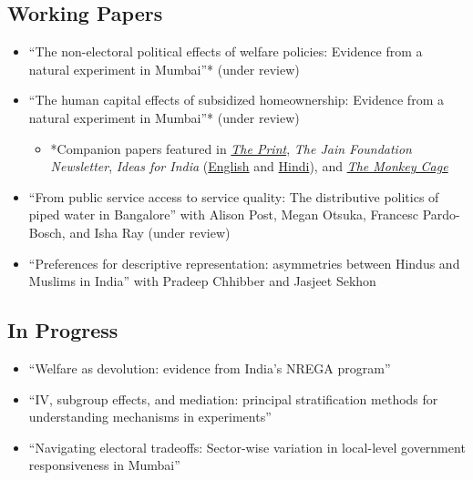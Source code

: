 \documentclass[11pt]{article}
\begin{document}
\subsection*{Working Papers}

\begin{itemize}
	\item[]``The non-electoral political effects of welfare policies: Evidence from a natural experiment in Mumbai''* (under review)
	\item[]``The human capital effects of subsidized homeownership: Evidence from a natural experiment in Mumbai''* (under review)
	\begin{itemize}
	\item[]*Companion papers featured in \href{https://theprint.in/opinion/mumbai-residents-win-govt-housing-lottery-and-spend-more-on-kids-education-jobs-study/290485/}{\textit{The Print}}, \textit{The Jain Foundation Newsletter}, \textit{Ideas for India} (\href{https://www.ideasforindia.in/topics/poverty-inequality/household-level-effects-of-affordable-housing-evidence-from-mumbai.html}{English} and \href{https://www.ideasforindia.in/topics/poverty-inequality/household-level-effects-of-affordable-housing-evidence-from-mumbai-hindi.html}{Hindi}), and \href{https://www.washingtonpost.com/news/monkey-cage/wp/2019/01/31/heres-what-gavin-newsom-elizabeth-warren-and-microsoft-should-know-if-want-to-end-the-affordable-housing-crisis/?tid=sm_tw_cage}{\textit{The Monkey Cage}}
	\end{itemize} 	
	
		\item[]``From public service access to service quality: The distributive politics of piped water in Bangalore'' with Alison Post, Megan Otsuka, Francesc Pardo-Bosch, and Isha Ray (under review)
	
		\item[]``Preferences for descriptive representation: asymmetries between Hindus and Muslims in India'' with Pradeep Chhibber and Jasjeet Sekhon 
	
		\end{itemize}

\subsection*{In Progress}
\begin{itemize}
\item[]``Welfare as devolution: evidence from India's NREGA program''
	\item[]``IV, subgroup effects, and mediation: principal stratification methods for understanding mechanisms in experiments''
		\item[]``Navigating electoral tradeoffs: Sector-wise variation in local-level government responsiveness in Mumbai'' 	\end{itemize}
\vspace{3mm}
\end{document}
